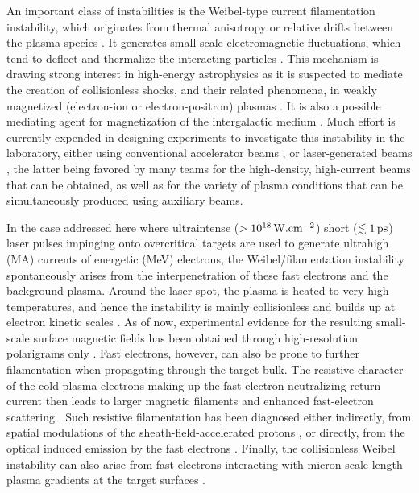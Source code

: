 \documentclass[aps,twocolumn,showpacs,superscriptaddress]{revtex4}
\begin{document}
An important class of instabilities is the Weibel-type current filamentation instability, which originates from thermal anisotropy \cite{PRL_Weibel_1959} or relative drifts between the plasma species \cite{POF_Fried_1959}. It generates small-scale electromagnetic fluctuations, which tend to deflect and thermalize the interacting particles \cite{POF_Davidson_1972,PRL_Lee_1973,APJ_Jaroschek_2004,PRL_Adam_2006}. This mechanism is drawing strong interest in high-energy astrophysics as it is suspected to mediate the creation of collisionless shocks, and their related phenomena, in weakly magnetized (electron-ion or electron-positron) plasmas \cite{RPP_Marcowith_2016}. It is also a possible mediating agent for magnetization of the intergalactic medium \cite{APJ_Schlickeiser_2003}.
%
Much effort is currently expended in designing experiments to investigate this instability in the laboratory, either using conventional accelerator beams \cite{PRL_Allen_2012}, or laser-generated beams \cite{PRL_Fox_2013,NP_Huntington_2015},
the latter being favored by many teams for the high-density, high-current beams that can be obtained, as well as for the variety of plasma conditions that can be simultaneously produced using auxiliary beams. 

In the case addressed here where ultraintense ($>10^{18}\,\rm W.cm^{-2}$) short ($\lesssim 1\,\rm ps$) laser pulses impinging onto overcritical targets are used to generate ultrahigh (MA) currents of energetic (MeV) electrons, the Weibel/filamentation instability spontaneously arises from the interpenetration of these fast electrons and the background plasma. Around the laser spot, the plasma is heated to very high temperatures, and hence the instability is mainly collisionless and builds up at electron kinetic scales \cite{PRL_Adam_2006}. As of now, experimental evidence for the resulting small-scale surface magnetic fields has been obtained through high-resolution polarigrams only \cite{PNAS_Mondal_2012}. 
Fast electrons, however, can also be prone to further filamentation when propagating through the target bulk. The resistive character of the cold plasma electrons making up the fast-electron-neutralizing return current \cite{POP_Gremillet_2002} then leads to larger magnetic filaments \cite{JPP_Fiore_2010} and enhanced fast-electron scattering \cite{POP_Yang_2016}. 
Such resistive filamentation has been diagnosed either indirectly, from spatial modulations of the sheath-field-accelerated protons \cite{PRL_Fuchs_2003, PRL_MacLellan_2013}, or directly,
from the optical induced emission by the fast electrons  \cite{PRL_Storm_2009}.
Finally, the collisionless Weibel instability can also arise from fast electrons interacting with micron-scale-length plasma gradients at the target surfaces \cite{PRE_Wei_2004, PRL_Gode_2017, NJP_Scott_2017}.
\end{document}
